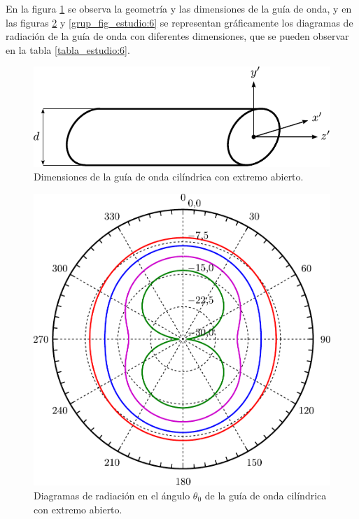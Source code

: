 En la figura \ref{fig_estudio:20} se observa la geometría y las dimensiones de la guía de onda, y en las figuras \ref{fig_estudio:21} y \ref{grup_fig_estudio:6} se representan gráficamente los diagramas de radiación de la guía de onda con diferentes dimensiones, que se pueden observar en la tabla \ref{tabla_estudio:6}.
\begin{figure}[H]
\centering
\includegraphics[scale = 1]{Figures/Estudio/estudio_20}
\caption{Dimensiones de la guía de onda cilíndrica con extremo abierto.}
\label{fig_estudio:20}
\end{figure}
\begin{figure}[H]
\centering
\includegraphics[scale = 0.5]{Figures/Estudio/estudio_21}
\caption{Diagramas de radiación en el ángulo $\theta_0$ de la guía de onda cilíndrica con extremo abierto.}
\label{fig_estudio:21}
\end{figure}
